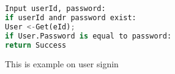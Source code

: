 \begin{lstlisting}[language=Python , caption=User signin]
Input userId, password:
if userId andr password exist:
User <-Get(eId); 
if User.Password is equal to password:
return Success
\end{lstlisting}
This is example on user signin